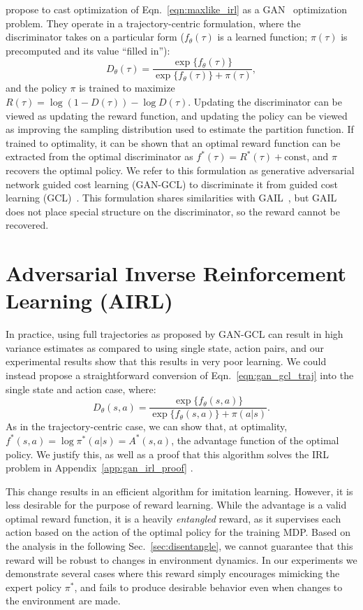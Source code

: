 \documentclass{article} \usepackage{iclr2018_conference,times}
\begin{document}
\citet{Finn16b} propose to cast optimization of Eqn.~\ref{eqn:maxlike_irl} as a GAN~\citep{gan-goodfellow} optimization problem. They operate in a trajectory-centric formulation, where the discriminator takes on a particular form ($f_\theta(\tau)$ is a learned function; $\pi(\tau)$ is precomputed and its value ``filled in''):
\begin{equation}
\label{eqn:gan_gcl_traj}
D_\theta(\tau) = \frac{\exp\{f_\theta(\tau)\}}{\exp\{f_\theta(\tau)\} + \pi(\tau)} ,
\end{equation}
and the policy $\pi$ is trained to maximize $R(\tau) = \log(1-D(\tau))-\log D(\tau)$. Updating the discriminator can be viewed as updating the reward function, and updating the policy can be viewed as improving the sampling distribution used to estimate the partition function. If trained to optimality, it can be shown that an optimal reward function can be extracted from the optimal discriminator as $f^*(\tau) = R^*(\tau) + \text{const}$, and $\pi$ recovers the optimal policy. We refer to this formulation as generative adversarial network guided cost learning (GAN-GCL) to discriminate it from guided cost learning (GCL)~\citep{Finn16b}. This formulation shares similarities with GAIL~\citep{Ho16b}, but GAIL does not place special structure on the discriminator, so the reward cannot be recovered.
 
\section{Adversarial Inverse Reinforcement Learning (AIRL)}
\label{sec:gan_irl}
In practice, using full trajectories as proposed by GAN-GCL can result in high variance estimates as compared to using single state, action pairs, and our experimental results show that this results in very poor learning. We could instead propose a straightforward conversion of Eqn.~\ref{eqn:gan_gcl_traj} into the single state and action case, where:
\[
D_\theta(s,a) = \frac{\exp\{f_\theta(s,a)\}}{\exp\{f_\theta(s,a)\} + \pi(a|s)} .
\]
As in the trajectory-centric case, we can show that, at optimality, $f^*(s,a) = \log \pi^*(a|s) = A^*(s,a)$, the advantage function of the optimal policy. We justify this, as well as a proof that this algorithm solves the IRL problem in Appendix~\ref{app:gan_irl_proof} .

This change results in an efficient algorithm for imitation learning. However, it is less desirable for the purpose of reward learning. While the advantage is a valid optimal reward function, it is a heavily \textit{entangled} reward, as it supervises each action based on the action of the optimal policy for the training MDP. Based on the analysis in the following Sec.~\ref{sec:disentangle}, we cannot guarantee that this reward will be robust to changes in environment dynamics. In our experiments we demonstrate several cases where this reward simply encourages mimicking the expert policy $\pi^*$, and fails to produce desirable behavior even when changes to the environment are made.
 
\end{document}
